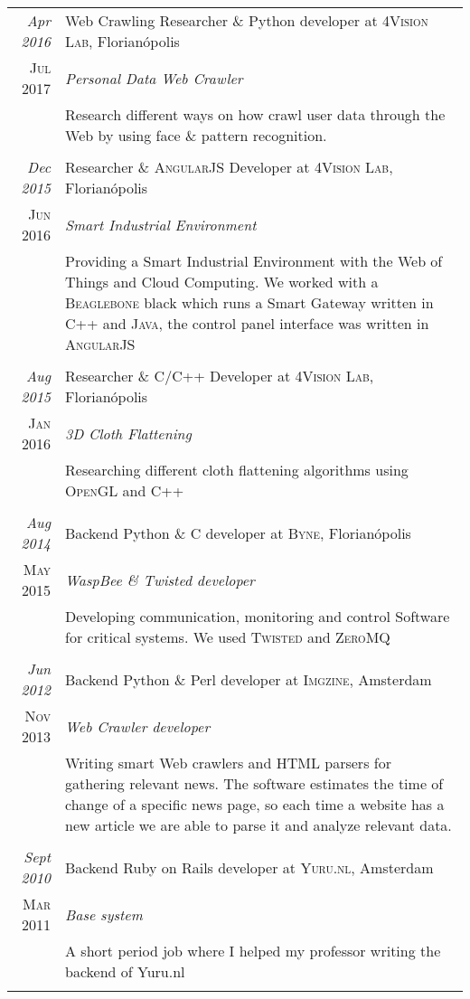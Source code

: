 \documentclass[a4paper,10pt]{article}
\begin{document}
\begin{longtable}{r|p{11cm}}
\emph{Apr 2016} & Web Crawling Researcher \& Python developer at \textsc{4Vision Lab}, Florianópolis \\\textsc{Jul 2017} & \emph{Personal Data Web Crawler}\\&\footnotesize{Research different ways on how crawl user data through the Web by using face \& pattern recognition.}\\\multicolumn{2}{c}{} \\

\emph{Dec 2015} & Researcher \& \textsc{AngularJS} Developer at \textsc{4Vision Lab}, Florianópolis \\\textsc{Jun 2016} & \emph{Smart Industrial Environment}\\&\footnotesize{Providing a Smart Industrial Environment with the Web of Things and Cloud Computing. We worked with a \textsc{Beaglebone} black which runs a Smart Gateway written in \textsc{C++} and \textsc{Java}, the control panel interface was written in \textsc{AngularJS}}\\\multicolumn{2}{c}{} \\

\emph{Aug 2015} & Researcher \& C/C++ Developer at \textsc{4Vision Lab}, Florianópolis \\\textsc{Jan 2016} & \emph{3D Cloth Flattening}\\&\footnotesize{Researching different cloth flattening algorithms using \textsc{OpenGL} and \textsc{C++}}\\\multicolumn{2}{c}{} \\

\emph{Aug 2014} & Backend Python \& C developer at \textsc{Byne}, Florianópolis \\\textsc{May 2015} & \emph{WaspBee \& Twisted developer}\\&\footnotesize{Developing communication, monitoring and control Software for critical systems. We used \textsc{Twisted} and \textsc{ZeroMQ}}\\\multicolumn{2}{c}{} \\

\emph{Jun 2012} & Backend Python \& Perl developer at \textsc{Imgzine}, Amsterdam \\\textsc{Nov 2013} & \emph{Web Crawler developer}\\&\footnotesize{Writing smart Web crawlers and \textsc{HTML} parsers for gathering relevant news. The software estimates the time of change of a specific news page, so each time a website has a new article we are able to parse it and analyze relevant data.}\\\multicolumn{2}{c}{} \\

\emph{Sept 2010} & Backend Ruby on Rails developer at \textsc{Yuru.nl}, Amsterdam \\\textsc{Mar 2011} & \emph{Base system}\\&\footnotesize{A short period job where I helped my professor writing the backend of Yuru.nl}\\\multicolumn{2}{c}{} \\

\end{longtable}
\end{document}
